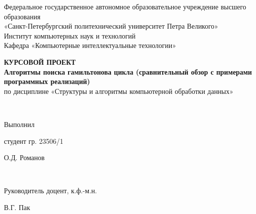 \begin{titlepage}

	\begin{center}

		Федеральное государственное автономное образовательное учреждение высшего образования \\
		«Санкт-Петербургский политехнический университет Петра Великого» \\
		Институт компьютерных наук и технологий \\
		Кафедра «Компьютерные интеллектуальные технологии» \\[5cm]

    \begin{minipage}{12cm}
        \begin{center}

		\large {\bf КУРСОВОЙ ПРОЕКТ} \\[0.7cm]
		\normalsize {\bf Алгоритмы поиска гамильтонова цикла (сравнительный обзор с примерами программных реализаций)} \\[0.2cm]
		по дисциплине «Структуры и алгоритмы компьютерной обработки данных»

        \end{center}
    \end{minipage} \\[4cm]

	\end{center}


    \begin{center}
        \begin{minipage}[t]{5cm}
            \begin{flushleft}
                Выполнил

                студент гр. 23506/1
            \end{flushleft}
        \end{minipage}
        \hfill
        \begin{minipage}[t]{4cm}
            \begin{flushright}
            О.Д. Романов
            \end{flushright}
        \end{minipage} \\[0.5cm]

        \begin{minipage}[t]{4cm}
            \begin{flushleft}
                Руководитель доцент, к.ф.-м.н.
            \end{flushleft}
            \flushleft
        \end{minipage}
        \hfill
        \begin{minipage}[t]{4cm}
            \begin{flushright}
                В.Г. Пак
            \end{flushright}
        \end{minipage}
    \end{center}


\end{titlepage}
